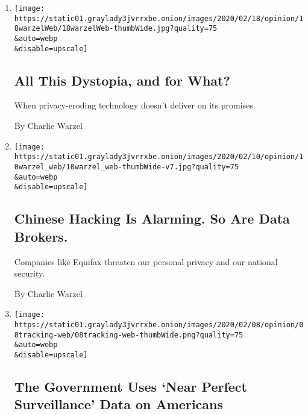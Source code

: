 \begin{enumerate}
\def\labelenumi{\arabic{enumi}.}
\item
  \href{/2020/02/18/opinion/facial-recognition-surveillance-privacy.html}{}

  \texttt{[image: https://static01.graylady3jvrrxbe.onion/images/2020/02/18/opinion/18warzelWeb/18warzelWeb-thumbWide.jpg?quality=75\\\&auto=webp\\\&disable=upscale]}

  \hypertarget{all-this-dystopia-and-for-what}{%
  \subsection{All This Dystopia, and for
  What?}\label{all-this-dystopia-and-for-what}}

  When privacy-eroding technology doesn't deliver on its promises.

  By Charlie Warzel
\item
  \href{/2020/02/10/opinion/equifax-breach-china-hacking.html}{}

  \texttt{[image: https://static01.graylady3jvrrxbe.onion/images/2020/02/10/opinion/10warzel\_web/10warzel\_web-thumbWide-v7.jpg?quality=75\\\&auto=webp\\\&disable=upscale]}

  \hypertarget{chinese-hacking-is-alarming-so-are-data-brokers}{%
  \subsection{Chinese Hacking Is Alarming. So Are Data
  Brokers.}\label{chinese-hacking-is-alarming-so-are-data-brokers}}

  Companies like Equifax threaten our personal privacy and our national
  security.

  By Charlie Warzel
\item
  \href{/2020/02/07/opinion/dhs-cell-phone-tracking.html}{}

  \texttt{[image: https://static01.graylady3jvrrxbe.onion/images/2020/02/08/opinion/08tracking-web/08tracking-web-thumbWide.png?quality=75\\\&auto=webp\\\&disable=upscale]}

  \hypertarget{the-government-uses-near-perfect-surveillance-data-on-americans}{%
  \subsection{The Government Uses `Near Perfect Surveillance' Data on
  Americans}\label{the-government-uses-near-perfect-surveillance-data-on-americans}}


\end{enumerate}
